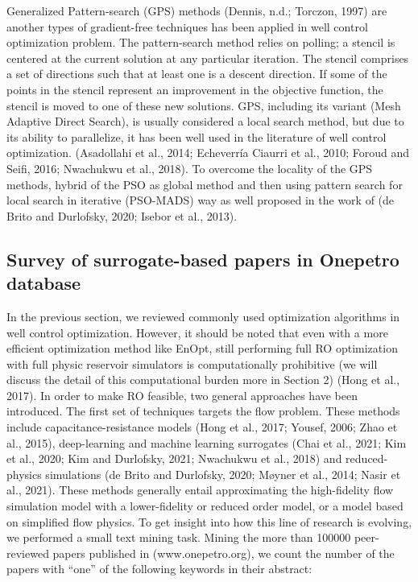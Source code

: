 \documentclass[]{elsarticle} %
\begin{document}
Generalized Pattern-search (GPS) methods (Dennis, n.d.; Torczon, 1997) are another types of gradient-free techniques has been applied in well control optimization problem. The pattern-search method relies on polling; a stencil is centered at the current solution at any particular iteration. The stencil comprises a set of directions such that at least one is a descent direction. If some of the points in the stencil represent an improvement in the objective function, the stencil is moved to one of these new solutions. GPS, including its variant (Mesh Adaptive Direct Search), is usually considered a local search method, but due to its ability to parallelize, it has been well used in the literature of well control optimization. (Asadollahi et al., 2014; Echeverría Ciaurri et al., 2010; Foroud and Seifi, 2016; Nwachukwu et al., 2018). To overcome the locality of the GPS methods, hybrid of the PSO as global method and then using pattern search for local search in iterative (PSO-MADS) way as well proposed in the work of (de Brito and Durlofsky, 2020; Isebor et al., 2013).

\hypertarget{survey-of-surrogate-based-papers-in-onepetro-database}{%
\subsection{Survey of surrogate-based papers in Onepetro database}\label{survey-of-surrogate-based-papers-in-onepetro-database}}

In the previous section, we reviewed commonly used optimization algorithms in well control optimization. However, it should be noted that even with a more efficient optimization method like EnOpt, still performing full RO optimization with full physic reservoir simulators is computationally prohibitive (we will discuss the detail of this computational burden more in Section 2) (Hong et al., 2017). In order to make RO feasible, two general approaches have been introduced. The first set of techniques targets the flow problem. These methods include capacitance-resistance models (Hong et al., 2017; Yousef, 2006; Zhao et al., 2015), deep-learning and machine learning surrogates (Chai et al., 2021; Kim et al., 2020; Kim and Durlofsky, 2021; Nwachukwu et al., 2018) and reduced-physics simulations (de Brito and Durlofsky, 2020; Møyner et al., 2014; Nasir et al., 2021). These methods generally entail approximating the high-fidelity flow simulation model with a lower-fidelity or reduced order model, or a model based on simplified flow physics. To get insight into how this line of research is evolving, we performed a small text mining task. Mining the more than 100000 peer-reviewed papers published in (www.onepetro.org), we count the number of the papers with ``one'' of the following keywords in their abstract:
\end{document}
